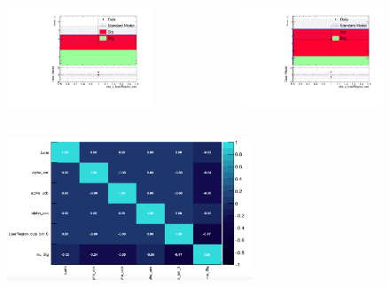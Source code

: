 \documentclass{beamer}
\begin{document}
\begin{frame}
\begin{columns}[onlytextwidth]
\begin{column}{.5\textwidth}
\begin{figure}
  \includegraphics[width=\textwidth]{before}
\end{figure}
\end{column}
\begin{column}{.5\textwidth}
\begin{figure}
  \includegraphics[width=\textwidth]{after}
\end{figure}
\end{column}
\end{columns}
\begin{figure}
\includegraphics[width=0.65\textwidth]{correlationmatrix}
\end{figure}
\end{frame}
\end{document}
